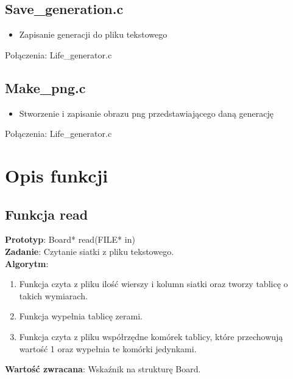\documentclass[12pt,a4paper,notitlepage]{report}
\begin{document}
\subsection{Save\_generation.c}
\begin{itemize}
\item Zapisanie generacji do pliku tekstowego
\end{itemize}
Połączenia: Life\_generator.c

\subsection{Make\_png.c}
\begin{itemize}
\item Stworzenie i zapisanie obrazu png przedstawiającego daną generację
\end{itemize}
Połączenia: Life\_generator.c


\section{Opis funkcji}

\subsection{Funkcja read}
\textbf {Prototyp}: Board* read(FILE* in)\\
\textbf {Zadanie}: Czytanie siatki z pliku tekstowego.\\
\textbf {Algorytm}:
\begin{enumerate} 
\item Funkcja czyta z pliku ilość wierszy i kolumn siatki oraz tworzy tablicę o takich wymiarach.
\item Funkcja wypełnia tablicę zerami.
\item Funkcja czyta z pliku współrzędne komórek tablicy, które przechowują wartość 1 oraz wypełnia te komórki jedynkami.
\end{enumerate}
\textbf {Wartość zwracana}: Wskaźnik na strukturę Board.
\end{document}
